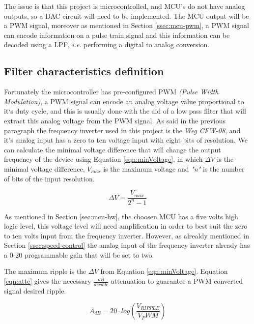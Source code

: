 		The issue is that this project is microcontrolled, and MCU's do not have analog outputs, so a DAC circuit will need to be implemented. The MCU output will be a PWM signal, moreover as mentioned in Section \ref{ssec:mcu-pwm}, a PWM signal can encode information on a pulse train signal and this information can be decoded using a LPF, \textit{i.e.} performing a digital to analog conversion.

	\subsection{Filter characteristics definition}\label{ssec:filterCharacteristicsDefinition}
		\par
		Fortunately the microcontroller has pre-configured PWM \textit{(Pulse Width Modulation)}, a PWM signal can encode an analog voltage value proportional to it`s duty cycle, and this is usually done with the aid of a low pass filter that will extract this analog voltage from the PWM signal. As said in the previous paragraph the frequency inverter used in this project is the \textit{Weg CFW-08}, and it's analog input has a zero to ten voltage input with eight bits of resolution. We can calculate the minimal voltage difference that will change the output frequency of the device using Equation \ref{eqn:minVoltage}, in which $\Delta V$ is the minimal voltage difference, $V_{max}$ is the maximum voltage and \textit{"n"} is the number of bits of the input resolution.

			\begin{equation}\label{eqn:minVoltage}
				\Delta V=\frac{V_{max}}{2^{n} - 1}
			\end{equation}
	
		As mentioned in Section \ref{sec:mcu-hw}, the choosen MCU has a five volts high logic level, this voltage level will need amplification in order to best suit the zero to ten volts input from the frequency inverter. However, as alrealdy mentioned in Section \ref{ssec:speed-control} the analog input of the frequency inverter already has a 0-20 programmable gain that will be set to two. 
		\par
		The maximum ripple is the $\Delta V$ from Equation \ref{eqn:minVoltage}. Equation \ref{eqn:atte} \cite{metivier2013pwm} gives the necessary $\frac{dB}{decade}$ attenuation to guarantee a PWM converted signal desired ripple.

	 		\begin{equation}\label{eqn:atte}
				A_{dB}=20\cdot log \left( \frac{V_{RIPPLE}}{V_PWM} \right) 
			\end{equation}
			
